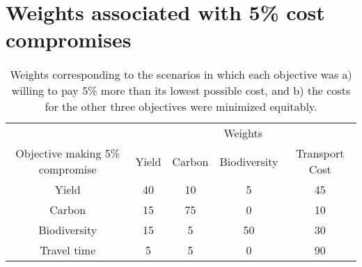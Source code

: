 \documentclass[a4paper]{article}
\begin{document}
\clearpage
\section*{\large Weights associated with 5\% cost compromises}

\begin{table}[ht]
\begin{center}
\captionsetup{width=0.85\linewidth, font=small}
\caption{Weights corresponding to the scenarios in which each objective was a) willing to pay 5\% more than its lowest possible cost, and b) the costs for the other three objectives were minimized equitably.}
\begin{tabular}{ccccc}
\hline
& \multicolumn{4}{c}{Weights}\\
Objective making 5\% compromise & Yield & Carbon & Biodiversity & Transport Cost \\
\hline\hline
Yield & 40 & 10 & 5 & 45 \\
Carbon & 15 & 75 & 0 & 10 \\
Biodiversity & 15 & 5 & 50 & 30 \\
Travel time & 5 & 5 & 0 & 90 \\
\hline
\end{tabular}
\end{center}
\label{default}
\end{table}


 

\end{document}
